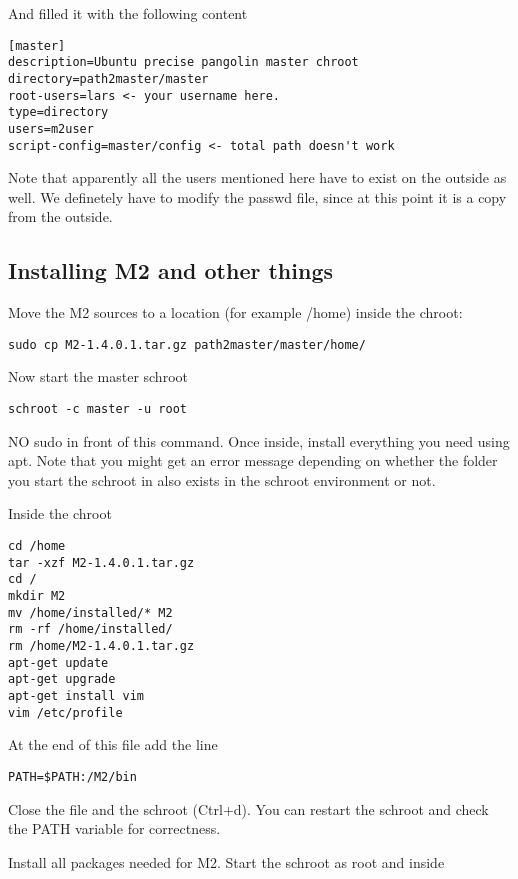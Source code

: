 \documentclass[a4paper]{article}
\begin{document}
And filled it with the following content

\begin{verbatim}
[master]
description=Ubuntu precise pangolin master chroot
directory=path2master/master
root-users=lars <- your username here.
type=directory
users=m2user
script-config=master/config <- total path doesn't work
\end{verbatim}

Note that apparently all the users mentioned here have to exist on the outside as well.
We definetely have to modify the passwd file, since at this point it is a copy from the outside.

\subsection{Installing M2 and other things}

Move the M2 sources to a location (for example /home) inside the chroot:

\begin{verbatim}
sudo cp M2-1.4.0.1.tar.gz path2master/master/home/
\end{verbatim}

Now start the master schroot

\begin{verbatim}
schroot -c master -u root
\end{verbatim}

NO sudo in front of this command. Once inside, install everything you need using apt.
Note that you might get an error message depending on whether the folder you start the schroot in also exists in the schroot environment or not.

Inside the chroot

\begin{verbatim}
cd /home
tar -xzf M2-1.4.0.1.tar.gz
cd /
mkdir M2
mv /home/installed/* M2
rm -rf /home/installed/
rm /home/M2-1.4.0.1.tar.gz
apt-get update
apt-get upgrade
apt-get install vim
vim /etc/profile
\end{verbatim}

At the end of this file add the line

\begin{verbatim}
PATH=$PATH:/M2/bin
\end{verbatim}

Close the file and the schroot (Ctrl+d). You can restart the schroot and check the PATH variable for correctness.

Install all packages needed for M2. Start the schroot as root and inside
\end{document}
